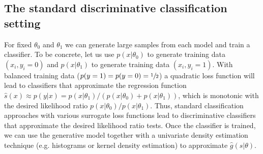 \documentclass[11pt, oneside]{article}   	%
\begin{document}
\subsection{The standard discriminative classification setting} 
For fixed $\theta_0$ and $\theta_1$ we can generate 
large samples from each model and train a classifier. To be concrete, let us use $p(x|\theta_0)$ to generate training 
data $(x_i,  y_i=0)$ and $p(x|\theta_1)$ to generate training data $(x_i , y_i=1)$. With balanced training data   ($p(y=1)=p(y=0)=\sfrac{1}{2}$) a quadratic loss function will lead to classifiers that approximate the regression function  $\hat{s}(x) \approx p(y|x) = p(x|\theta_1)/(p(x|\theta_0)+p(x|\theta_1))$, which is  monotonic with the desired likelihood ratio $p(x|\theta_0)/p(x|\theta_1)$. Thus, standard classification approaches with various surrogate loss functions lead to discriminative classifiers that approximate the desired likelihood ratio tests.  Once the classifier is trained, we can use the generative model together with a univariate density estimation technique (e.g. histograms or kernel density estimation) to approximate $\hat{g}(\hat{s}|\theta)$.


%
%

\end{document}
